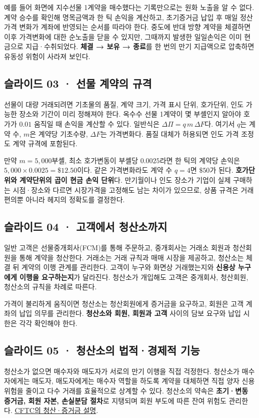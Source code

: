 \documentclass[11pt,a4paper]{article}
\begin{document}
예를 들어 화면에 지수선물 1계약을 매수했다는 기록만으로는 원화 노출을 알 수 없다. 계약 승수를 확인해 명목금액과 한 틱 손익을 계산하고, 초기증거금 납입 후 매일 정산가격 변화가 계좌에 반영되는 순서를 따라야 한다. 중도에 반대 방향 계약을 체결하면 이후 가격변화에 대한 순노출을 닫을 수 있지만, 그때까지 발생한 일일손익은 이미 현금으로 지급·수취되었다. \textbf{체결 → 보유 → 종료}를 한 번의 만기 지급액으로 압축하면 유동성 위험이 사라져 보인다.\par

\subsection{슬라이드 03 · 선물 계약의 규격}
선물이 대량 거래되려면 기초물의 품질, 계약 크기, 가격 표시 단위, 호가단위, 인도 가능한 장소와 기간이 미리 정해져야 한다. 옥수수 선물 1계약이 몇 부셸인지 알아야 호가가 $0.01$ 움직일 때 손익을 계산할 수 있다. 일반식은 $\Delta\Pi=q\,m\,\Delta F$다. 여기서 $q$는 계약 수, $m$은 계약당 기초수량, $\Delta F$는 가격변화다. 품질 대체가 허용되면 인도 가격 조정도 계약 규격에 포함된다.\par

만약 $m=5{,}000$부셸, 최소 호가변동이 부셸당 $0.0025$라면 한 틱의 계약당 손익은 $5{,}000\times0.0025=\$12.50$이다. 같은 가격변화라도 계약 수 $q=4$면 $\$50$가 된다. \textbf{호가단위와 계약단위의 곱이 현금 손익 단위}다. 만기월이나 인도 장소가 기업이 실제 구매하는 시점·장소와 다르면 시장가격을 고정해도 남는 차이가 있으므로, 상품 규격은 거래 편의뿐 아니라 헤지의 정확도를 결정한다.\par

\subsection{슬라이드 04 · 고객에서 청산소까지}
일반 고객은 선물중개회사(FCM)를 통해 주문하고, 중개회사는 거래소 회원과 청산회원을 통해 계약을 청산한다. 거래소는 거래 규칙과 매매 시장을 제공하고, 청산소는 체결 뒤 계약의 이행 관계를 관리한다. 고객이 누구와 화면상 거래했는지와 \textbf{신용상 누구에게 이행을 요구하는지}가 달라진다. 청산소가 개입해도 고객은 중개회사, 청산회원, 청산소의 규칙을 차례로 따른다.\par

가격이 불리하게 움직이면 청산소는 청산회원에게 증거금을 요구하고, 회원은 고객 계좌의 납입 의무를 관리한다. \textbf{청산소와 회원, 회원과 고객} 사이의 담보 요구와 납입 시한은 각각 확인해야 한다.\par

\subsection{슬라이드 05 · 청산소의 법적·경제적 기능}
청산소가 없으면 매수자와 매도자가 서로의 만기 이행을 직접 걱정한다. 청산소가 매수자에게는 매도자, 매도자에게는 매수자 역할을 하도록 계약을 대체하면 직접 양자 신용위험을 줄이고 다수 거래를 효율적으로 상계할 수 있다. 청산소의 약속은 \textbf{초기·변동 증거금, 회원 자본, 손실분담 절차}로 지탱되며 회원 부도에 따른 잔여 위험도 관리한다. \href{https://www.cftc.gov/LearnAndProtect/EducationCenter/economicpurpose}{CFTC의 청산·증거금 설명}.\par
\end{document}
